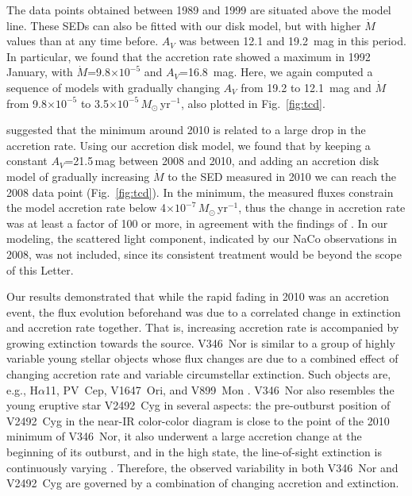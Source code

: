 \documentclass{aa}
\begin{document}
The data points obtained between 1989 and 1999 are situated above the
model line. These SEDs can also be fitted with our disk model, but
with higher $\dot{M}$ values than at any time before. $A_V$ was
between 12.1 and 19.2~mag in this period. In particular, we found that
the accretion rate showed a maximum in 1992 January, with
$\dot{M}$=9.8$\times10^{-5}$ and $A_V$=16.8~mag. Here, we again
computed a sequence of models with gradually changing $A_V$ from 19.2
to 12.1~mag and $\dot{M}$ from 9.8$\times10^{-5}$ to
3.5$\times10^{-5}\,M_{\odot}$\,yr$^{-1}$, also plotted in
Fig.~\ref{fig:tcd}.
 
\citet{kraus2016} suggested that the minimum around 2010 is related to
a large drop in the accretion rate. Using our accretion disk model, we
found that by keeping a constant $A_V$=21.5\,mag between 2008 and
2010, and adding an accretion disk model of gradually increasing
$\dot{M}$ to the SED measured in 2010 we can reach the 2008 data point
(Fig.~\ref{fig:tcd}). In the minimum, the measured fluxes constrain
the model accretion rate below 4$\times10^{-7}\,M_{\odot}$\,yr$^{-1}$,
thus the change in accretion rate was at least a factor of 100 or
more, in agreement with the findings of \citet{kraus2016}. In our
modeling, the scattered light component, indicated by our NaCo
observations in 2008, was not included, since its consistent treatment
would be beyond the scope of this Letter.

Our results demonstrated that while the rapid fading in 2010 was an
accretion event, the flux evolution beforehand was due to a correlated
change in extinction and accretion rate together. That is, increasing
accretion rate is accompanied by growing extinction towards the
source. V346~Nor is similar to a group of highly variable young
stellar objects whose flux changes are due to a combined effect of
changing accretion rate and variable circumstellar extinction. Such
objects are, e.g., H$\alpha$11, PV~Cep, V1647~Ori, and V899~Mon
\citep{kun2011b,kun2011,mosoni2013,ninan2015}. V346~Nor also resembles
the young eruptive star V2492~Cyg in several aspects: the pre-outburst
position of V2492~Cyg in the near-IR color-color diagram is close to
the point of the 2010 minimum of V346~Nor, it also underwent a large
accretion change at the beginning of its outburst, and in the high
state, the line-of-sight extinction is continuously varying
\citep{kospal2011,kospal2013,hillenbrand2013}. Therefore, the observed
variability in both V346~Nor and V2492~Cyg are governed by a
combination of changing accretion and extinction.
\end{document}

